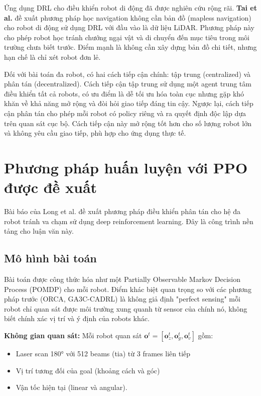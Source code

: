 Ứng dụng DRL cho điều khiển robot di động đã được nghiên cứu rộng rãi. \textbf{Tai et al.} \cite{tai2017collision} đề xuất phương pháp học navigation không cần bản đồ (mapless navigation) cho robot di động sử dụng DRL với đầu vào là dữ liệu LiDAR. Phương pháp này cho phép robot học tránh chướng ngại vật và di chuyển đến mục tiêu trong môi trường chưa biết trước. Điểm mạnh là không cần xây dựng bản đồ chi tiết, nhưng hạn chế là chỉ xét robot đơn lẻ.

Đối với bài toán đa robot, có hai cách tiếp cận chính: tập trung (centralized) và phân tán (decentralized). Cách tiếp cận tập trung sử dụng một agent trung tâm điều khiển tất cả robots, có ưu điểm là dễ tối ưu hóa toàn cục nhưng gặp khó khăn về khả năng mở rộng và đòi hỏi giao tiếp đáng tin cậy. Ngược lại, cách tiếp cận phân tán \cite{chen2017decentralized} cho phép mỗi robot có policy riêng và ra quyết định độc lập dựa trên quan sát cục bộ. Cách tiếp cận này mở rộng tốt hơn cho số lượng robot lớn và không yêu cầu giao tiếp, phù hợp cho ứng dụng thực tế.

\section{Phương pháp huấn luyện với PPO được đề xuất}
\label{sec:long_method}

Bài báo của Long et al. \cite{long2018towards} đề xuất phương pháp điều khiển phân tán cho hệ đa robot tránh va chạm sử dụng deep reinforcement learning. Đây là công trình nền tảng cho luận văn này.

\subsection{Mô hình bài toán}
\label{subsec:long_formulation}

Bài toán được công thức hóa như một Partially Observable Markov Decision Process (POMDP) cho mỗi robot. Điểm khác biệt quan trọng so với các phương pháp trước (ORCA, GA3C-CADRL) là không giả định "perfect sensing" mỗi robot chỉ quan sát được môi trường xung quanh từ sensor của chính nó, không biết chính xác vị trí và ý định của robots khác.

\textbf{Không gian quan sát:} Mỗi robot quan sát $\mathbf{o}^t = [\mathbf{o}_z^t, \mathbf{o}_g^t, \mathbf{o}_v^t]$ gồm: 
\begin{itemize}
    \item Laser scan 180° với 512 beams (tia) từ 3 frames liên tiếp
    \item Vị trí tương đối của goal (khoảng cách và góc)
    \item Vận tốc hiện tại (linear và angular).
\end{itemize}

